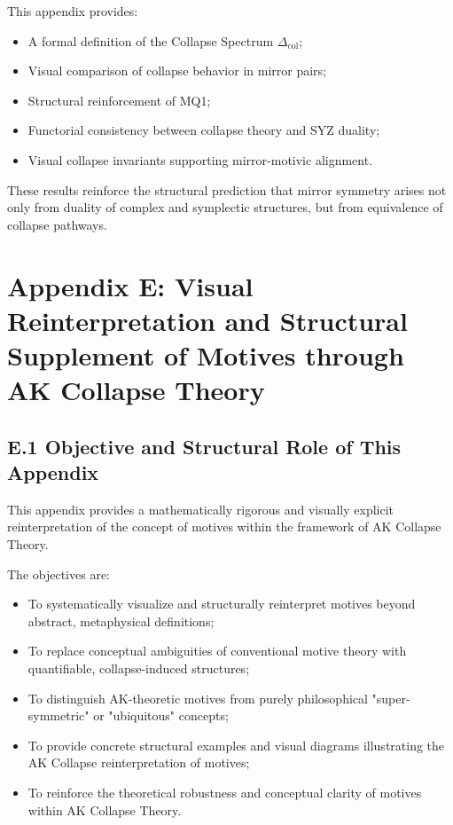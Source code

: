 \documentclass[11pt]{article}
\begin{document}
This appendix provides:

\begin{itemize}
    \item A formal definition of the Collapse Spectrum $\Delta_{\mathrm{col}}$;
    \item Visual comparison of collapse behavior in mirror pairs;
    \item Structural reinforcement of MQ1;
    \item Functorial consistency between collapse theory and SYZ duality;
    \item Visual collapse invariants supporting mirror-motivic alignment.
\end{itemize}

These results reinforce the structural prediction that mirror symmetry arises not only from duality of complex and symplectic structures, but from equivalence of collapse pathways.

\FloatBarrier




\section*{Appendix E: Visual Reinterpretation and Structural Supplement of Motives through AK Collapse Theory}

\subsection*{E.1 Objective and Structural Role of This Appendix}

This appendix provides a mathematically rigorous and visually explicit reinterpretation of the concept of motives within the framework of AK Collapse Theory.

The objectives are:

\begin{itemize}
    \item To systematically visualize and structurally reinterpret motives beyond abstract, metaphysical definitions;
    \item To replace conceptual ambiguities of conventional motive theory with quantifiable, collapse-induced structures;
    \item To distinguish AK-theoretic motives from purely philosophical "super-symmetric" or "ubiquitous" concepts;
    \item To provide concrete structural examples and visual diagrams illustrating the AK Collapse reinterpretation of motives;
    \item To reinforce the theoretical robustness and conceptual clarity of motives within AK Collapse Theory.
\end{itemize}
\end{document}
